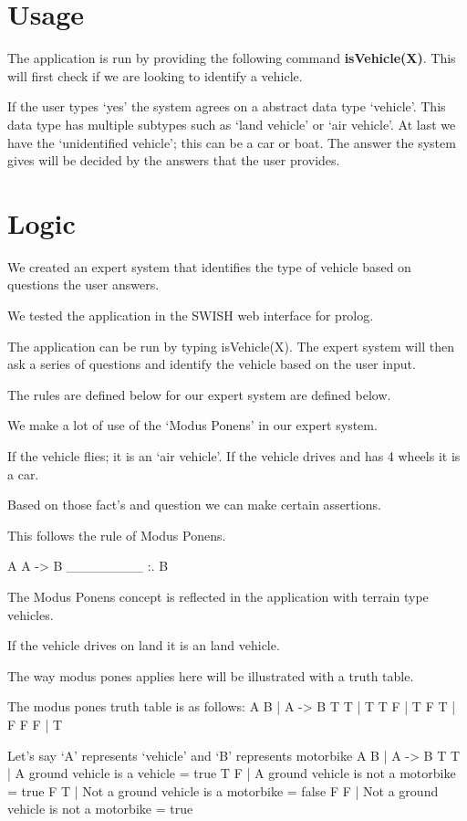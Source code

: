 \section{Usage} \label{man-usage}
The application is run by providing the following command \textbf{isVehicle(X)}.
This will first check if we are looking to identify a vehicle.

If the user types `yes' the system agrees on a abstract data type `vehicle'.
This data type has multiple subtypes such as `land vehicle' or `air vehicle'.
At last we have the `unidentified vehicle'; this can be a car or boat.
The answer the system gives will be decided by the answers that the user provides.

\newpage
\section{Logic} \label{man-logic}
We created an expert system that identifies the type of vehicle based on
questions the user answers.

We tested the application in the SWISH web interface for prolog.

The application can be run by typing isVehicle(X).
The expert system will then ask a series of questions and identify the vehicle based on the user input.

The rules are defined below for our expert system are defined below.

We make a lot of use of the `Modus Ponens' in our expert system.

If the vehicle flies; it is an `air vehicle'.
If the vehicle drives and has 4 wheels it is a car.

Based on those fact's and question we can make certain assertions.

This follows the rule of Modus Ponens.

A
A -> B
\_\_\_\_\_\_\_\_
:. B

The Modus Ponens concept is reflected in the application with terrain type vehicles.

If the vehicle drives on land it is an land vehicle.

The way modus pones applies here will be illustrated with a truth table.

The modus pones truth table is as follows:
A B | A -> B
T T | T
T F | T
F T | F
F F | T

Let's say `A' represents `vehicle'
and `B' represents motorbike
A B | A -> B
T T | A ground vehicle is a vehicle      = true
T F | A ground vehicle is not a motorbike     = true
F T | Not a ground vehicle is a motorbike     = false
F F | Not a ground vehicle is not a motorbike = true

